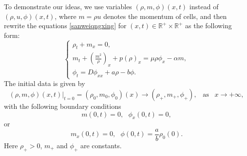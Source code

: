 \documentclass[11pt]{article}
\theoremstyle{plain}
\numberwithin{equation}{section}
\begin{document}
	
To demonstrate our ideas, we use variables $(\rho,m,\phi)(x,t)$ instead of $(\rho,u,\phi)(x,t)$, where  $m=\rho u$  denotes the momentum of cells, and then rewrite the equations  \eqref{sanweiqngxing} for $(x,t)\in\mathbb{R}^+\times\mathbb{R}^{+}$ as the following form:	
		\begin{equation}\label{1}
		\left\{
		\begin{array}{lr}
			\rho_t+m_x=0, \\[2mm]
			m_t+\left(\frac{m^2}{\rho}\right)_x+p(\rho)_x=\mu\rho\phi_x-\alpha m,\\[2mm]
			\phi_t=D\phi_{xx}+a\rho-b\phi.
		\end{array}
		\right.
	\end{equation}
 The initial data is given by
	\begin{equation}\label{3}
		(\rho,m,\phi)(x,t)|_{t=0}=(\rho_0,m_0,\phi_0)(x)\to (\rho_{+},m_{+},\phi_{+}), \;\;\;
		\mbox{as} \;\;\;x \to +\infty,
	\end{equation}
with the following boundary conditions
\begin{equation}\label{3a}
 m(0,t)=0, \ \ \ \phi_x(0,t)=0,
 \end{equation}
or 
\begin{equation}\label{3b}
 m_{x}(0,t)=0,\ \ \ \phi(0,t)=\frac{a}{b}\rho_0(0).	
 \end{equation}
Here $\rho_{+}>0$, $m_{+}$ and $\phi_{+}$ are constants. 
\end{document}
